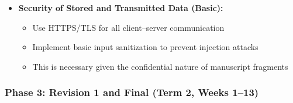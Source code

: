 \documentclass{article}
\begin{document}
\begin{itemize}
    \item \textbf{Security of Stored and Transmitted Data (Basic):}
    \begin{itemize}
        \item Use HTTPS/TLS for all client--server communication
        \item Implement basic input sanitization to prevent injection attacks
        \item This is necessary given the confidential nature of manuscript fragments
    \end{itemize}
\end{itemize}

\subsubsection{Phase 3: Revision 1 and Final (Term 2, Weeks 1--13)}
\end{document}
